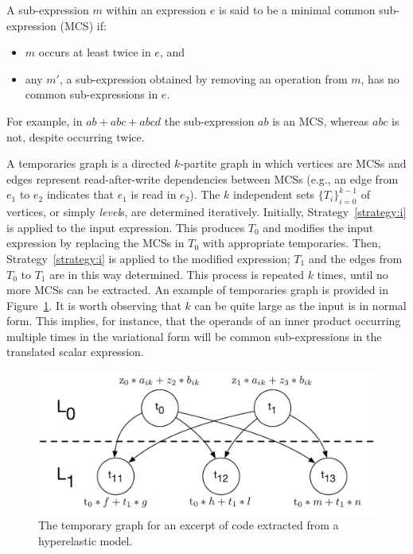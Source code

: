 \begin{Def}
A sub-expression $m$ within an expression $e$ is said to be a minimal common sub-expression (MCS) if:
\begin{itemize}
\item $m$ occurs at least twice in $e$, and
\item any $m'$, a sub-expression obtained by removing an operation from $m$, has no common sub-expressions in $e$.
\end{itemize}
\end{Def}

For example, in $a b + a b c + a b c d$ the sub-expression $a b$ is an MCS, whereas $a b c$ is not, despite occurring twice. 

A temporaries graph is a directed $k$-partite graph in which vertices are MCSs and edges represent read-after-write dependencies between MCSs (e.g., an edge from $e_1$ to $e_2$ indicates that $e_1$ is read in $e_2$). The $k$ independent sets $\lbrace T_i \rbrace_{i=0}^{k-1}$ of vertices, or simply {\em level}s, are determined iteratively. Initially, Strategy~\ref{strategy:i} is applied to the input expression. This produces $T_0$ and modifies the input expression by replacing the MCSs in $T_0$ with appropriate temporaries. Then, Strategy~\ref{strategy:i} is applied to the modified expression; $T_1$ and the edges from $T_0$ to $T_1$ are in this way determined. This process is repeated $k$ times, until no more MCSs can be extracted. An example of temporaries graph is provided in Figure~\ref{fig:opt:tg}. It is worth observing that $k$ can be quite large as the input is in normal form. This implies, for instance, that the operands of an inner product occurring multiple times in the variational form will be common sub-expressions in the translated scalar expression.

\begin{figure}[ht]
\centering
\includegraphics[scale=0.6]{optimality/figures/temporaries_graph.pdf}
\caption{The temporary graph for an excerpt of code extracted from a hyperelastic model.}
\label{fig:opt:tg}
\end{figure}

